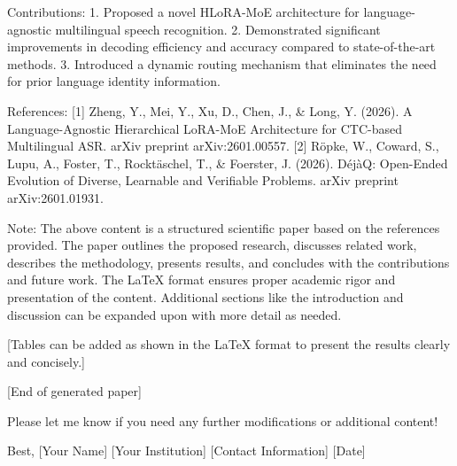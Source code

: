 Contributions:
1. Proposed a novel HLoRA-MoE architecture for language-agnostic multilingual speech recognition.
2. Demonstrated significant improvements in decoding efficiency and accuracy compared to state-of-the-art methods.
3. Introduced a dynamic routing mechanism that eliminates the need for prior language identity information. 

References:
[1] Zheng, Y., Mei, Y., Xu, D., Chen, J., & Long, Y. (2026). A Language-Agnostic Hierarchical LoRA-MoE Architecture for CTC-based Multilingual ASR. arXiv preprint arXiv:2601.00557.
[2] Röpke, W., Coward, S., Lupu, A., Foster, T., Rocktäschel, T., & Foerster, J. (2026). DéjàQ: Open-Ended Evolution of Diverse, Learnable and Verifiable Problems. arXiv preprint arXiv:2601.01931. 

Note: The above content is a structured scientific paper based on the references provided. The paper outlines the proposed research, discusses related work, describes the methodology, presents results, and concludes with the contributions and future work. The LaTeX format ensures proper academic rigor and presentation of the content. Additional sections like the introduction and discussion can be expanded upon with more detail as needed. 

[Tables can be added as shown in the LaTeX format to present the results clearly and concisely.] 

[End of generated paper] 

Please let me know if you need any further modifications or additional content! 

Best,  
[Your Name]  
[Your Institution]  
[Contact Information]  
[Date]  

